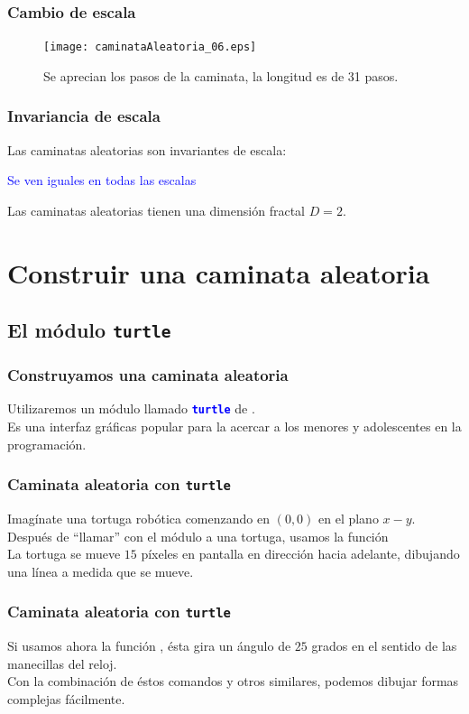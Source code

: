 \begin{frame}
\frametitle{Cambio de escala}
\begin{figure}
	\centering
	\texttt{[image: caminataAleatoria\_06.eps]}
	\caption{Se aprecian los pasos de la caminata, la longitud es de 31 pasos.}
\end{figure}
\end{frame}
\begin{frame}
\frametitle{Invariancia de escala}
Las caminatas aleatorias son invariantes de escala:
\\
\bigskip
\begin{center}
\textcolor{blue}{Se ven iguales en todas las escalas}
\end{center}
\pause
Las caminatas aleatorias tienen una dimensión fractal $D = 2$.
\end{frame}
\section{Construir una caminata aleatoria}
\subsection{El módulo \texttt{turtle}}
\begin{frame}
\frametitle{Construyamos una caminata aleatoria}
Utilizaremos un módulo llamado \textcolor{blue}{\textbf{\texttt{turtle}}} de \python.
\\
\bigskip
Es una interfaz gráficas popular para la acercar a los menores y adolescentes en la programación.
\end{frame}
\begin{frame}
\frametitle{Caminata aleatoria con \texttt{turtle}}
Imagínate una tortuga robótica comenzando en $(0, 0)$ en el plano $x-y$.
\\
\bigskip
Después de \enquote{llamar} con el módulo a una tortuga, usamos la función 
\\
\bigskip
\pause
La tortuga se mueve $15$ píxeles en pantalla en dirección hacia adelante, dibujando una línea a medida que se mueve.
\end{frame}
\begin{frame}
\frametitle{Caminata aleatoria con \texttt{turtle}}
Si usamos ahora la función , ésta gira un ángulo de $25$ grados en el sentido de las manecillas del reloj.
\\
\bigskip
Con la combinación de éstos comandos y otros similares, podemos dibujar formas complejas fácilmente.
\end{frame}
